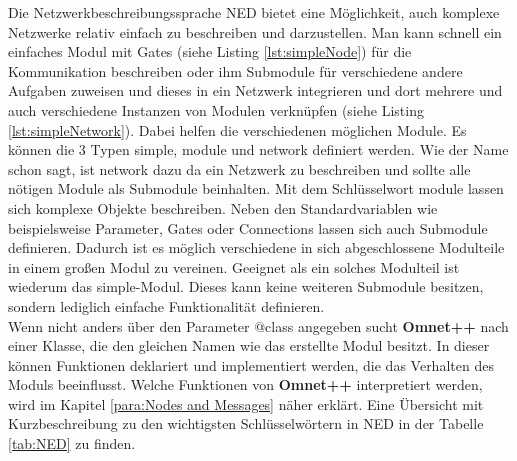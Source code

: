Die Netzwerkbeschreibungssprache NED\cite{ned} bietet eine Möglichkeit, auch komplexe Netzwerke relativ einfach zu beschreiben und darzustellen. Man kann schnell ein einfaches Modul mit Gates (siehe Listing \ref{lst:simpleNode}) für die Kommunikation beschreiben oder ihm Submodule für verschiedene andere Aufgaben zuweisen und dieses in ein Netzwerk integrieren und dort mehrere und auch verschiedene Instanzen von Modulen verknüpfen (siehe Listing \ref{lst:simpleNetwork}).
\newline
Dabei helfen die verschiedenen möglichen Module. Es können die 3 Typen simple, module und network definiert werden. Wie der Name schon sagt, ist network dazu da ein Netzwerk zu beschreiben und sollte alle nötigen Module als Submodule beinhalten. 
\newline
Mit dem Schlüsselwort module lassen sich komplexe Objekte beschreiben. Neben den Standardvariablen wie beispielsweise Parameter, Gates oder Connections lassen sich auch Submodule definieren. Dadurch ist es möglich verschiedene in sich abgeschlossene Modulteile in einem großen Modul zu vereinen.
\newline
Geeignet als ein solches Modulteil ist wiederum das simple-Modul. Dieses kann keine weiteren Submodule besitzen, sondern lediglich einfache Funktionalität definieren.\\
Wenn nicht anders über den Parameter @class angegeben sucht \textbf{Omnet++} nach einer Klasse, die den gleichen Namen wie das erstellte Modul besitzt. In dieser können Funktionen deklariert und implementiert werden, die das Verhalten des Moduls beeinflusst. Welche Funktionen von \textbf{Omnet++} interpretiert werden, wird im Kapitel \ref{para:Nodes and Messages} näher erklärt.
Eine Übersicht mit Kurzbeschreibung zu den wichtigsten Schlüsselwörtern in NED in der Tabelle \ref{tab:NED} zu finden.

